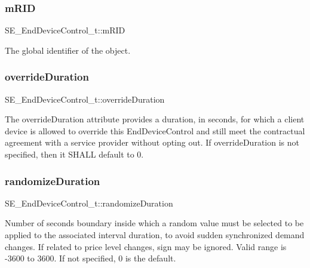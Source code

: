 \subsubsection{\texorpdfstring{m\+R\+ID}{mRID}}
{\footnotesize\ttfamily S\+E\+\_\+\+End\+Device\+Control\+\_\+t\+::m\+R\+ID}

The global identifier of the object. \mbox{\label{group__EndDeviceControl_ga8a762812da5a0774db22d5b8984c4992}} 
\subsubsection{\texorpdfstring{override\+Duration}{overrideDuration}}
{\footnotesize\ttfamily S\+E\+\_\+\+End\+Device\+Control\+\_\+t\+::override\+Duration}

The override\+Duration attribute provides a duration, in seconds, for which a client device is allowed to override this End\+Device\+Control and still meet the contractual agreement with a service provider without opting out. If override\+Duration is not specified, then it S\+H\+A\+LL default to 0. \mbox{\label{group__EndDeviceControl_ga403954727f4a26b9d25e0456d3f91340}} 
\subsubsection{\texorpdfstring{randomize\+Duration}{randomizeDuration}}
{\footnotesize\ttfamily S\+E\+\_\+\+End\+Device\+Control\+\_\+t\+::randomize\+Duration}

Number of seconds boundary inside which a random value must be selected to be applied to the associated interval duration, to avoid sudden synchronized demand changes. If related to price level changes, sign may be ignored. Valid range is -\/3600 to 3600. If not specified, 0 is the default. \mbox{\label{group__EndDeviceControl_gac9278298c4d98c9ba32267d7e113cce2}} 
